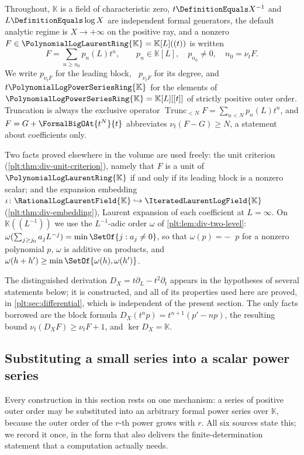 \documentclass[11pt,oneside]{article}
\theoremstyle{plain}
\theoremstyle{definition}
\theoremstyle{remark}
\newcommand{\K}{\mathbb{K}}
\newcommand{\PLpow}{\PolynomialLogPowerSeriesRing{\K}}   %
\newcommand{\PLlau}{\PolynomialLogLaurentRing{\K}}       %
\newcommand{\PLrat}{\RationalLogLaurentField{\K}}        %
\newcommand{\PLit}{\IteratedLaurentLogField{\K}}         %
\newcommand{\ordt}{\nu_{t}}                              %
\DeclareMathOperator{\degL}{deg_{L}}
\newcommand{\Trunc}[2]{\operatorname{Trunc}_{<#2}#1}     %
\newcommand{\DX}{D_{X}}                                  %
\begin{document}
Throughout, \(\K\) is a field of characteristic zero, \(t\DefinitionEquals
X^{-1}\) and \(L\DefinitionEquals\log X\) are independent formal generators,
the default analytic regime is \(X\to+\infty\) on the positive ray, and a
nonzero \(F\in\PLlau=\K[L]((t))\) is written
\begin{equation}\label{plt:eq:dif-normal-form}
  F=\sum_{n\ge n_{0}}p_{n}(L)t^{n},
  \qquad p_{n}\in\K[L],\quad p_{n_{0}}\ne0,\quad n_{0}=\ordt F .
\end{equation}
We write \(p_{\ordt F}\) for the leading block, \(\degL p_{\ordt F}\) for its
degree, and \(t\PLpow\) for the elements of \(\PLpow=\K[L][[t]]\) of strictly
positive outer order.  Truncation is always the exclusive operator
\(\Trunc{F}{N}=\sum_{n<N}p_{n}(L)t^{n}\), and \(F=G+\FormalBigOAt{t^{N}}{t}\)
abbreviates \(\ordt(F-G)\ge N\), a statement about coefficients only.

Two facts proved elsewhere in the volume are used freely: the unit criterion
(\cref{plt:thm:div-unit-criterion}), namely that \(F\) is a unit of \(\PLlau\)
if and only if its leading block is a nonzero scalar; and the expansion
embedding \(\iota\colon\PLrat\hookrightarrow\PLit\)
(\cref{plt:thm:div-embedding}), Laurent expansion of each coefficient at
\(L=\infty\).  On \(\K((L^{-1}))\) we use the \(L^{-1}\)-adic order
\(\omega\) of \cref{plt:lem:div-two-level}: \(\omega(\sum_{j\ge j_{0}}a_{j}
L^{-j})=\min\SetOf{j:a_{j}\ne0}\), so that \(\omega(p)=-\degL p\) for a nonzero
polynomial \(p\), \(\omega\) is additive on products, and
\(\omega(h+h')\ge\min\SetOf{\omega(h),\omega(h')}\).

The distinguished derivation \(\DX=t\partial_{L}-t^{2}\partial_{t}\) appears in
the hypotheses of several statements below; it is constructed, and all of its
properties used here are proved, in \cref{plt:sec:differential}, which is
independent of the present section.  The only facts borrowed are the block
formula \(\DX(t^{n}p)=t^{n+1}(p'-np)\), the resulting bound
\(\ordt(\DX F)\ge\ordt F+1\), and \(\ker\DX=\K\).

\subsection{Substituting a small series into a scalar power series}
\label{plt:sec:dif-substitution}

Every construction in this section rests on one mechanism: a series of
positive outer order may be substituted into an arbitrary formal power series
over \(\K\), because the outer order of the \(r\)-th power grows with \(r\).
All six sources state this; we record it once, in the form that also delivers
the finite-determination statement that a computation actually needs.
\end{document}
